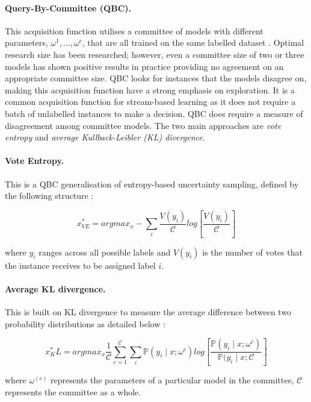 \documentclass[ %
                    author={James Stephenson},
                supervisor={Dr. Edwin Simpson},
                    degree={MSc},
                     title={PROJECT PLAN},
                  subtitle={Bayesian Deep Learning For Extractive Test Summarisation},
                      type={},
                      year={2022}]{../additions/dissertation}
\begin{document}
				\paragraph{Query-By-Committee (QBC).} This acquisition function utilises a committee of models with different parameters, ${\omega^1, \ldots, \omega^{c}}$, that are all trained on the same labelled dataset \cite{Seung92}. Optimal research size has been researched; however, even a committee size of two or three models has shown positive results in practice \cite{Seung92, Craven08, Nigam98} providing no agreement on an appropriate committee size. QBC looks for instances that the models disagree on, making this acquisition function have a strong emphasis on exploration. It is a common acquisition function for stream-based learning \cite{Settles09} as it does not require a batch of unlabelled instances to make a decision. QBC does require a measure of disagreement among committee models. The two main approaches are \emph{vote entropy} and \emph{average Kullback-Leibler (KL) divergence}. 

				\paragraph{Vote Entropy.} This is a QBC generalisation of entropy-based uncertainty sampling, defined by the following structure \cite{Dagan95}:

				$$
					x^\ast_{VE} = argmax_x - \sum_i \frac{V(y_i)}{\mathcal{C}} log \left[\frac{V(y_i)}{\mathcal{C}}\right]
				$$
		
				\noindent
				where $y_i$ ranges across all possible labels and $V(y_i)$ is the number of votes that the instance receives to be assigned label $i$.

				\paragraph{Average KL divergence.} This is built on KL divergence \cite{Kullback51} to measure the average difference between two probability distributions as detailed below \cite{Nigam98}:

				$$
					x^\ast_KL = argmax_x \frac{1}{\mathcal{C}} \sum_{c=1}^{\mathcal{C}} \sum_i \mathbb{P}(y_i \mid x; \omega^{c}) log \left[\frac{\mathbb{P}(y_i \mid x; \omega^{c})}{\mathbb{P}(y_i \mid x; \mathcal{C}}\right]
				$$

				\noindent
				where $\omega^{(c)}$ represents the parameters of a particular model in the committee, $\mathcal{C}$ represents the committee as a whole.
\end{document}
